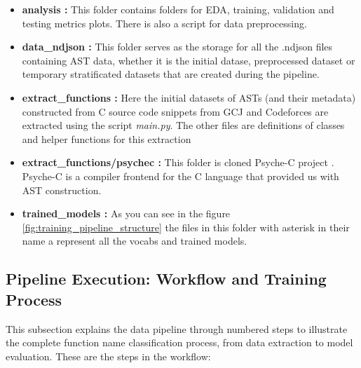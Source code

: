 \documentclass[10pt,english,a4paper]{report}
\begin{document}
\begin{itemize}
    \item \textbf{analysis :} This folder contains folders for EDA, training, validation
    and testing metrics plots. There is also a script for data preprocessing.

    \item \textbf{data\_ndjson :} This folder serves as the storage for all the .ndjson files
    containing AST data, whether it is the initial datase, preprocessed dataset or temporary stratificated datasets
    that are created during the pipeline.

    \item \textbf{extract\_functions :} Here the initial datasets of ASTs (and their metadata) constructed from C source code snippets from GCJ and Codeforces
    are extracted using the script \textit{main.py}. The other files are definitions of classes and helper functions
    for this extraction
    \item \textbf{extract\_functions/psychec :} This folder is cloned Psyche-C project \cite{psychec}. Psyche-C is a compiler frontend for the C language that provided us with AST construction.

    \item \textbf{trained\_models :} As you can see in the figure \ref{fig:training_pipeline_structure} the files in this folder with asterisk in their name a represent all the vocabs and trained models.


\end{itemize}

\subsection{Pipeline Execution: Workflow and Training Process}

This subsection explains the data pipeline through numbered steps to
illustrate the complete function name classification process, from data
 extraction to model evaluation. These are the steps in the workflow:
\end{document}
